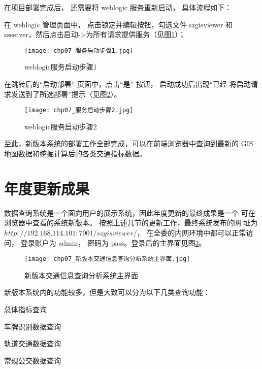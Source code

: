 在项目部署完成后， 还需要将 weblogic 服务重新启动， 具体流程如下：

\begin{nbeae}
\item 在 weblogic 管理页面中， 点击锁定并编辑按钮，勾选文件 szgisviewer 和
szserver，然后点击启动->为所有请求提供服务（见图\ref{fig:chp07_服务启动步骤1}）；

\begin{figure}[!ht]
  \centering
  \texttt{[image: chp07\_服务启动步骤1.jpg]}
  \caption{weblogic服务启动步骤1\label{fig:chp07_服务启动步骤1} }
\end{figure}

\item 在跳转后的“启动部署” 页面中，点击“是” 按钮， 启动成功后出现“已经
将启动请求发送到了所选部署”提示（见图\ref{fig:chp07_服务启动步骤2}）。

\begin{figure}[!ht]
  \centering
  \texttt{[image: chp07\_服务启动步骤2.jpg]}
  \caption{weblogic服务启动步骤2\label{fig:chp07_服务启动步骤2} }
\end{figure}
\end{nbeae}

至此，新版本系统的部署工作全部完成，可以在前端浏览器中查询到最新的
GIS 地图数据和挖掘计算后的各类交通指标数据。

\section{年度更新成果}
数据查询系统是一个面向用户的展示系统，因此年度更新的最终成果是一个
可在浏览器中查看的系统新版本。 按照上述几节的更新工作，最终系统发布的网
址为$http://192.168.114.101:7001/szgisviewer/$， 在全委的内网环境中都可以正常访
问， 登录账户为 admin， 密码为 pass。登录后的主界面见图\ref{fig:chp07_新版本交通信息查询分析系统主界面}。

\begin{figure}[!ht]
  \centering
  \texttt{[image: chp07\_新版本交通信息查询分析系统主界面.jpg]}
  \caption{新版本交通信息查询分析系统主界面\label{fig:chp07_新版本交通信息查询分析系统主界面} }
\end{figure}

\item 新版本系统内的功能较多，但是大致可以分为以下几类查询功能：

\begin{cit}
\item 总体指标查询
\item 车牌识别数据查询
\item 轨道交通数据查询
\item 常规公交数据查询
\end{cit}

